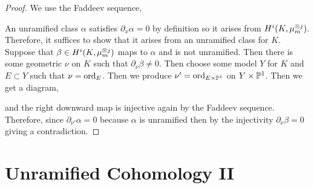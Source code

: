 \documentclass[12pt]{article}
\begin{document}
\begin{proof}
We use the Faddeev sequence,
\begin{center}
\end{center}
An unramified class $\alpha$ satisfies $\partial_x \alpha = 0$ by definition so it arises from $H^i(K, \mu_m^{\ot j})$. Therefore, it suffices to show that it arises from an unramified class for $K$. Suppose that $\beta \in H^i(K, \mu_m^{\ot j})$ maps to $\alpha$ and is not unramified. Then there is some geometric $\nu$ on $K$ such that $\partial_\nu \beta \neq 0$. Then choose some model $Y$ for $K$ and $E \subset Y$ such that $\nu = \ord_E$. Then we produce $\nu' = \ord_{E \times \P^1}$ on $Y \times \P^1$. Then we get a diagram,
\begin{center}
\end{center}
and the right downward map is injective again by the Faddeev sequence. Therefore, since $\partial_{\nu'} \alpha = 0$ because $\alpha$ is unramified then by the injectivity $\partial_\nu \beta = 0$ giving a contradiction. 
\end{proof}


\section{Unramified Cohomology II}
\end{document}
